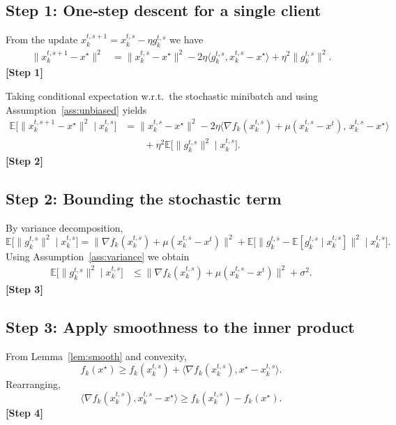 \documentclass[11pt]{article}
\begin{document}
\subsection*{Step 1: One‑step descent for a single client}
From the update $x_{k}^{t,s+1}=x_{k}^{t,s}-\eta g_{k}^{t,s}$ we have
\begin{align}
    \|x_{k}^{t,s+1}-x^{\star}\|^{2}
    &=\|x_{k}^{t,s}-x^{\star}\|^{2}
      -2\eta\langle g_{k}^{t,s},x_{k}^{t,s}-x^{\star}\rangle
      +\eta^{2}\|g_{k}^{t,s}\|^{2}. \tag{1}
\end{align}
\textbf{[Step 1]}

Taking conditional expectation w.r.t.\ the stochastic minibatch and using Assumption~\ref{ass:unbiased} yields
\begin{align}
    \mathbb{E}\!\bigl[\|x_{k}^{t,s+1}-x^{\star}\|^{2}\mid x_{k}^{t,s}\bigr]
    &=\|x_{k}^{t,s}-x^{\star}\|^{2}
      -2\eta\bigl\langle\nabla f_k(x_{k}^{t,s})+\mu(x_{k}^{t,s}-x^{t}),\,x_{k}^{t,s}-x^{\star}\bigr\rangle \nonumber\\
    &\qquad +\eta^{2}\mathbb{E}\!\bigl[\|g_{k}^{t,s}\|^{2}\mid x_{k}^{t,s}\bigr]. \tag{2}
\end{align}
\textbf{[Step 2]}

\subsection*{Step 2: Bounding the stochastic term}
By variance decomposition,
\[
    \mathbb{E}\!\bigl[\|g_{k}^{t,s}\|^{2}\mid x_{k}^{t,s}\bigr]
    =\|\nabla f_k(x_{k}^{t,s})+\mu(x_{k}^{t,s}-x^{t})\|^{2}
     +\mathbb{E}\!\bigl[\|g_{k}^{t,s}-\mathbb{E}[g_{k}^{t,s}\mid x_{k}^{t,s}]\|^{2}\mid x_{k}^{t,s}\bigr].
\]
Using Assumption~\ref{ass:variance} we obtain
\begin{align}
    \mathbb{E}\!\bigl[\|g_{k}^{t,s}\|^{2}\mid x_{k}^{t,s}\bigr]
    &\le \|\nabla f_k(x_{k}^{t,s})+\mu(x_{k}^{t,s}-x^{t})\|^{2}+\sigma^{2}. \tag{3}
\end{align}
\textbf{[Step 3]}

\subsection*{Step 3: Apply smoothness to the inner product}
From Lemma~\ref{lem:smooth} and convexity,
\[
    f_k(x^{\star})\ge f_k(x_{k}^{t,s})+\langle\nabla f_k(x_{k}^{t,s}),x^{\star}-x_{k}^{t,s}\rangle .
\]
Rearranging,
\[
    \langle\nabla f_k(x_{k}^{t,s}),x_{k}^{t,s}-x^{\star}\rangle
    \ge f_k(x_{k}^{t,s})-f_k(x^{\star}). \tag{4}
\]
\textbf{[Step 4]}
\end{document}
